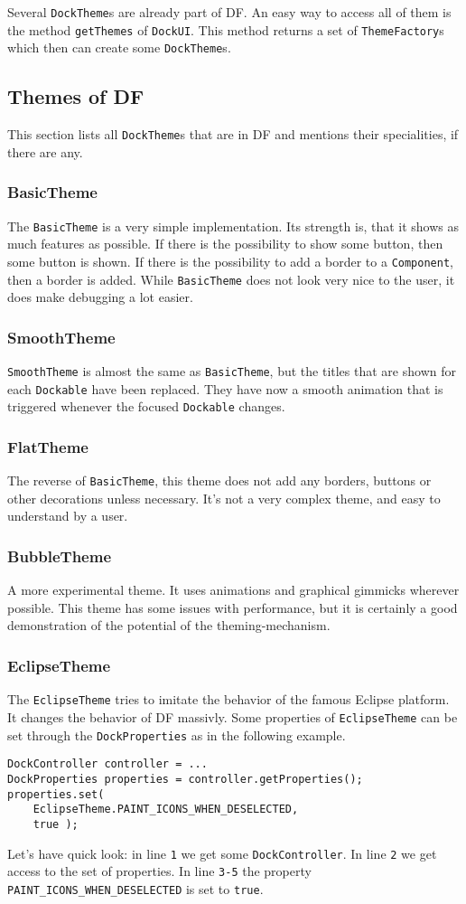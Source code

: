 \documentclass[a4paper,10pt]{article}
\newcommand{\src}[1]{\lstinline[basicstyle=\normalsize\ttfamily,keywordstyle=\normalsize\ttfamily,identifierstyle=\normalsize\ttfamily]|#1|}
\begin{document}
Several \src{DockTheme}s are already part of DF. An easy way to access all of them is the method \src{getThemes} of \src{DockUI}. This method returns a set of \src{ThemeFactory}s which then can create some \src{DockTheme}s.

\subsection{Themes of DF}
This section lists all \src{DockTheme}s that are in DF and mentions their specialities, if there are any.
\subsubsection{BasicTheme}
The \src{BasicTheme} is a very simple implementation. Its strength is, that it shows as much features as possible. If there is the possibility to show some button, then some button is shown. If there is the possibility to add a border to a \src{Component}, then a border is added. While \src{BasicTheme} does not look very nice to the user, it does make debugging a lot easier.
\subsubsection{SmoothTheme}
\src{SmoothTheme} is almost the same as \src{BasicTheme}, but the titles that are shown for each \src{Dockable} have been replaced. They have now a smooth animation that is triggered whenever the focused \src{Dockable} changes.
\subsubsection{FlatTheme}
The reverse of \src{BasicTheme}, this theme does not add any borders, buttons or other decorations unless necessary. It's not a very complex theme, and easy to understand by a user.
\subsubsection{BubbleTheme}
A more experimental theme. It uses animations and graphical gimmicks wherever possible. This theme has some issues with performance, but it is certainly a good demonstration of the potential of the theming-mechanism.
\subsubsection{EclipseTheme}
The \src{EclipseTheme} tries to imitate the behavior of the famous Eclipse platform. It changes the behavior of DF massivly. Some properties of \src{EclipseTheme} can be set through the \src{DockProperties} as in the following example.
\begin{lstlisting}
DockController controller = ...
DockProperties properties = controller.getProperties();
properties.set(
	EclipseTheme.PAINT_ICONS_WHEN_DESELECTED,
	true );
\end{lstlisting}
Let's have quick look: in line \src{1} we get some \src{DockController}. In line \src{2} we get access to the set of properties. In line \src{3-5} the property \\\src{PAINT_ICONS_WHEN_DESELECTED} is set to \src{true}.
\end{document}
